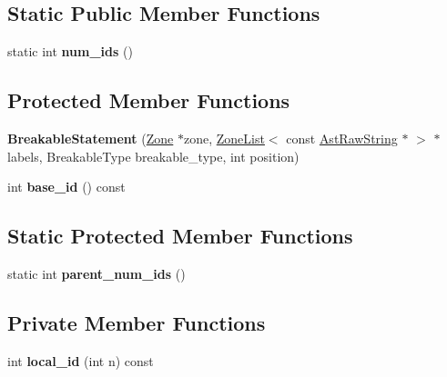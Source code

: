 \subsection*{Static Public Member Functions}
\begin{DoxyCompactItemize}
\item 
static int {\bfseries num\+\_\+ids} ()\hypertarget{classv8_1_1internal_1_1_breakable_statement_a0e372bdf453d7e5f79cab50a99b71061}{}\label{classv8_1_1internal_1_1_breakable_statement_a0e372bdf453d7e5f79cab50a99b71061}

\end{DoxyCompactItemize}
\subsection*{Protected Member Functions}
\begin{DoxyCompactItemize}
\item 
{\bfseries Breakable\+Statement} (\hyperlink{classv8_1_1internal_1_1_zone}{Zone} $\ast$zone, \hyperlink{classv8_1_1internal_1_1_zone_list}{Zone\+List}$<$ const \hyperlink{classv8_1_1internal_1_1_ast_raw_string}{Ast\+Raw\+String} $\ast$ $>$ $\ast$labels, Breakable\+Type breakable\+\_\+type, int position)\hypertarget{classv8_1_1internal_1_1_breakable_statement_a36d138d79514db4e82326cf7db7612b2}{}\label{classv8_1_1internal_1_1_breakable_statement_a36d138d79514db4e82326cf7db7612b2}

\item 
int {\bfseries base\+\_\+id} () const \hypertarget{classv8_1_1internal_1_1_breakable_statement_ac613d04c9fed8609ca001dfd0b0baff1}{}\label{classv8_1_1internal_1_1_breakable_statement_ac613d04c9fed8609ca001dfd0b0baff1}

\end{DoxyCompactItemize}
\subsection*{Static Protected Member Functions}
\begin{DoxyCompactItemize}
\item 
static int {\bfseries parent\+\_\+num\+\_\+ids} ()\hypertarget{classv8_1_1internal_1_1_breakable_statement_a8d4576725d3be1e05678aadb522cc487}{}\label{classv8_1_1internal_1_1_breakable_statement_a8d4576725d3be1e05678aadb522cc487}

\end{DoxyCompactItemize}
\subsection*{Private Member Functions}
\begin{DoxyCompactItemize}
\item 
int {\bfseries local\+\_\+id} (int n) const \hypertarget{classv8_1_1internal_1_1_breakable_statement_ae514c171e08cb17bf4d9a45c136fa941}{}\label{classv8_1_1internal_1_1_breakable_statement_ae514c171e08cb17bf4d9a45c136fa941}

\end{DoxyCompactItemize}
